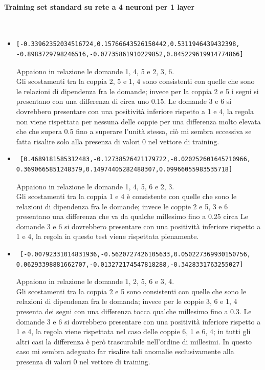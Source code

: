 \paragraph{Training set standard su rete a 4 neuroni per 1 layer}\mbox{}
\label{Training set standard su rete a 4 neuroni per 1 layer}
\\
\noindent
\begin{itemize}
\item \begin{verbatim}[-0.33962352034516724,0.15766643526150442,0.5311946439432398,
-0.8983729798246516,-0.07735861910229852,0.045229619914774866]
\end{verbatim}
Appaiono in relazione le domande 1, 4, 5 e 2, 3, 6.\\
Gli scostamenti tra la coppia 2, 5 e 1, 4 sono consistenti con quelle che sono le relazioni di dipendenza fra le domande; invece per la coppia 2 e 5  i segni si presentano con una differenza di circa uno 0.15. 
Le domande 3 e 6 si dovrebbero presentare con una positivit\`a inferiore rispetto a 1 e 4, la regola non viene rispettata per nessuna delle coppie per una differenza molto elevata che che supera 0.5 fino a superare l'unit\`a stessa, ci\`o mi sembra eccessiva se fatta risalire solo alla presenza di valori 0 nel vettore di training.

\item \begin{verbatim} [0.4689181585312483,-0.12738526421179722,-0.020252601645710966,
0.3690665851248379,0.14974405282488307,0.09966055983535718]
\end{verbatim}
Appaiono in relazione le domande 1, 4, 5, 6 e  2, 3.\\
Gli scostamenti tra la coppia  1 e 4 \`e consistente con quelle che sono le relazioni di dipendenza fra le domande; invece le coppie 2 e 5, 3 e 6 presentano una differenza che va  da qualche millesimo fino a 0.25 circa
Le domande 3 e 6 si dovrebbero presentare con una positivit\`a inferiore rispetto a 1 e 4, la regola in questo test viene rispettata pienamente.

\item \begin{verbatim} [-0.00792331014831936,-0.5620727426105633,0.050227369930150756,
0.06293398881662707,-0.013272174547818288,-0.3428331763255027]
\end{verbatim}
Appaiono in relazione le domande 1, 2, 5, 6 e 3, 4.\\
Gli scostamenti tra la coppia 2 e 5 sono consistenti con quelle che sono le relazioni di dipendenza fra le domanda; invece per le coppie 3, 6 e 1, 4 presenta dei segni con una differenza  tocca qualche millesimo fino a 0.3.
Le domande 3 e 6 si dovrebbero presentare con una positivit\`a inferiore rispetto a 1 e 4, la regola viene rispettata nel caso delle coppie 6, 1 e 6, 4; in tutti gli altri casi la differenza \`e per\`o trascurabile nell'ordine di millesimi. In questo caso  mi sembra adeguato far risalire tali anomalie esclusivamente alla presenza di valori 0 nel vettore di training. 



\end{itemize}
